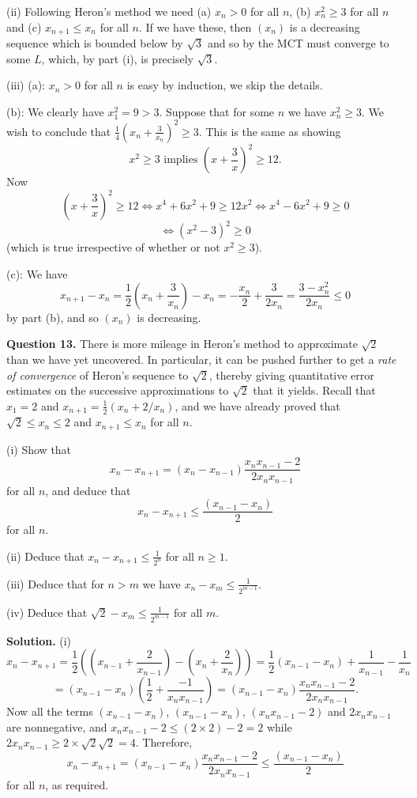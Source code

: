 \documentclass[12pt]{article}
\begin{document}
(ii) Following Heron's method we need (a) $x_n > 0$ for all $n$, (b) $x_n^2 \geq 3$ for all $n$ and (c) $x_{n+1} \leq x_n$ for all $n$.
If we have these, then $(x_n)$ is a decreasing sequence which is bounded below by $\sqrt{3}$ and so by the MCT must converge to some $L$, which, by part (i), is precisely $\sqrt{3}$.

(iii) (a): $x_n > 0$ for all $n$ is easy by induction, we skip the details. 

(b): We clearly have $x_1^2 = 9 >3$. Suppose that for some $n$ we have $x_n^2 \geq 3$. We wish to conclude that $ \frac{1}{4}\left( x_n + \frac{3}{x_n}\right)^2 \geq 3$. This is the same as showing 
\[ x^2 \geq 3 \mbox{ implies } \left(x + \frac{3}{x}\right)^2 \geq 12.\]
Now 
\[ \left(x + \frac{3}{x}\right)^2 \geq 12 \iff
x^4 + 6x^2 +9 \geq 12x^2 \iff x^4 - 6x^2 + 9 \geq 0 
\]
\[ \iff (x^2 - 3)^2 \geq 0
\]
(which is true irrespective of whether or not $x^2 \geq 3$). 

(c): We have
\[ x_{n+1} - x_n = \frac{1}{2}\left( x_n + \frac{3}{x_n}\right) - x_n = - \frac{x_n}{2} + \frac{3}{2x_n} = \frac{3 - x_n^2}{2x_n} \leq 0
\]
by part (b), and so $(x_n)$ is decreasing.

\bigskip
\noindent
{\bf Question 13.} There is more mileage in Heron's method to approximate $\sqrt{2}$ than we have yet uncovered. In particular, 
it can be pushed further to get a {\em rate of convergence} of Heron's sequence to $\sqrt{2}$, thereby giving quantitative error estimates on the successive approximations to $\sqrt{2}$ that it yields. Recall that $x_1 = 2$ and $x_{n+1} = \frac{1}{2} (x_n + 2/x_n)$, and we have already proved that $\sqrt{2} \leq x_n \leq 2$ and $x_{n+1} \leq x_n$ for all $n$.  

\medskip
\noindent
(i) Show that 
\[ x_n - x_{n+1} = (x_n - x_{n-1}) \frac{x_n x_{n-1} -2}{2 x_n x_{n-1}}\]
for all $n$, and deduce that
\[ x_n - x_{n+1} \leq \frac{(x_{n-1} - x_{n})}{2}\]
for all $n$.

\medskip
\noindent
(ii) Deduce that $x_n - x_{n+1} \leq \frac{1}{2^{n}}$ for all $n \geq 1$.

\medskip
\noindent
(iii) Deduce that for $n > m$ we have $x_n - x_{m} \leq \frac{1}{2^{m-1}}$.

\medskip
\noindent
(iv) Deduce that $\sqrt{2} - x_m \leq  \frac{1}{2^{m-1}}$ for all $m$.

\bigskip
\noindent
{\bf Solution.} (i)
\[ x_n - x_{n+1} = \frac{1}{2}\left(\left(x_{n-1} + \frac{2}{x_{n-1}}\right) - \left(x_n + \frac{2}{x_n}\right)\right)
=  \frac{1}{2}\left(x_{n-1} - x_{n}\right) + \frac{1}{x_{n-1}} - \frac{1}{x_{n}}\]
\[= \left(x_{n-1} - x_{n}\right)\left(\frac{1}{2} + \frac{-1}{x_n x_{n-1}}\right) = \left(x_{n-1} - x_{n}\right)\frac{x_n x_{n-1} - 2}{2x_n x_{n-1}}.
\]
Now all the terms $\left(x_{n-1} - x_{n}\right)$, $\left(x_{n-1} - x_{n}\right)$, $(x_n x_{n-1} - 2)$ and $2x_n x_{n-1}$ are nonnegative, and $ x_n x_{n-1} - 2 \leq (2 \times 2) - 2 =2$ while $2 x_n x_{n-1} \geq 2 \times \sqrt{2} \sqrt{2} = 4$. Therefore,
\[ x_n - x_{n+1} = \left(x_{n-1} - x_{n}\right)\frac{x_n x_{n-1} - 2}{2x_n x_{n-1}} \leq \frac{(x_{n-1} - x_{n})}{2}\]
for all $n$, as required.
\end{document}
